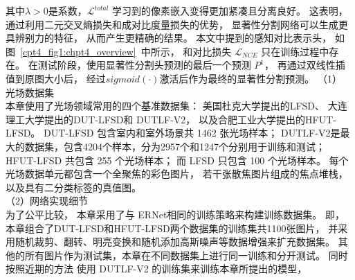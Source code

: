 % 
% 
% 
% 
其中$\lambda > 0 $是系数，$\mathcal{L}^{total}$
学习到的像素嵌入变得更加紧凑且分离良好。
这表明，通过利用二元交叉熵损失和成对比度量损失的优势，
显著性分割网络可以生成更具辨别力的特征，
从而产生更精确的结果。
%
%
%
%
本文中提到的感知对比表示头，
如图~\ref{cpt4_fig1:chpt4_overview}~中所示，
和对比损失 $\mathcal{L}_{NCE}$
只在训练过程中存在。
在测试阶段，使用显著性分割头预测的最后一个预测 $P^{1}$， 再通过双线性插值到原图大小后，
经过$sigmoid(\cdot)$激活后作为最终的显著性分割预测。
%
%
（1）
光场数据集\\
%
%
%
%
\indent 
本章使用了光场领域常用的四个基准数据集：
美国杜克大学提出的LFSD、
大连理工大学提出的DUT-LFSD和
DUTLF-V2，
以及合肥工业大学提出的HFUT-LFSD。
DUT-LFSD 包含室内和室外场景共 1462 张光场样本；
DUTLF-V2是最大的数据集，包含4204个样本，分为2957个和1247个分别用于训练和测试；
HFUT-LFSD 共包含 255 个光场样本；
而 LFSD 只包含 100 个光场样本。
每个光场数据单元都包含一个全聚焦的彩色图片，
若干张散焦图片组成的焦点堆栈，
以及具有二分类标签的真值图。
\\
%
%
%
%
\indent 
（2）网络实现细节\\
%
%
%
%
\indent 
为了公平比较，
本章采用了与 ERNet相同的训练策略来构建训练数据集。
即，
本章组合了DUT-LFSD和HFUT-LFSD两个数据集的训练集共1100张图片，
并采用随机裁剪、翻转、明亮变换和随机添加高斯噪声等数据增强来扩充数据集。
其他的所有图片作为测试集，本章在不同数据集上进行同一训练和分开测试。
同时按照近期的方法
使用 DUTLF-V2 的训练集来训练本章所提出的模型，
